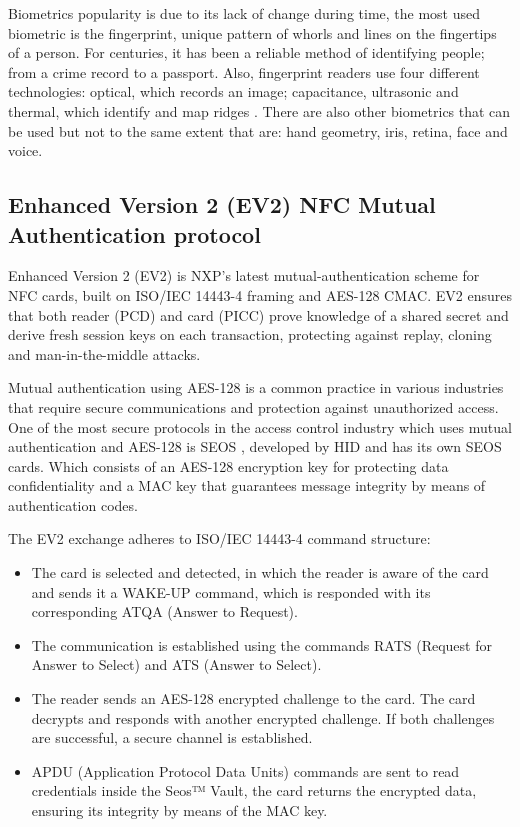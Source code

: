 Biometrics popularity is due to its lack of change during time, the most used biometric is the fingerprint, unique pattern of whorls and lines on the fingertips of a person. For centuries, it has been a reliable method of identifying people; from a crime record to a passport. Also, fingerprint readers use four different technologies: optical, which records an image; capacitance, ultrasonic and thermal, which identify and map ridges \cite{ref30}. There are also other biometrics that can be used but not to the same extent that are: hand geometry, iris, retina, face and voice.

\subsection{Enhanced Version 2 (EV2) NFC Mutual Authentication protocol}

Enhanced Version 2 (EV2) \cite{ref29} is NXP’s latest mutual-authentication scheme for NFC cards, built on ISO/IEC 14443-4 framing and AES-128 CMAC. EV2 ensures that both reader (PCD) and card (PICC) prove knowledge of a shared secret and derive fresh session keys on each transaction, protecting against replay, cloning and man-in-the-middle attacks.

Mutual authentication using AES-128 is a common practice in various industries that require secure communications and protection against unauthorized access. One of the most secure protocols in the access control industry which uses mutual authentication and AES-128 is SEOS \cite{ref31}, developed by HID and has its own SEOS cards. Which consists of an AES-128 encryption key for protecting data confidentiality and a MAC key that guarantees message integrity by means of authentication codes.

The EV2 exchange adheres to ISO/IEC 14443-4 command structure:
\begin{itemize}
	\item The card is selected and detected, in which the reader is aware of the card and sends it a WAKE-UP command, which is responded with its corresponding ATQA (Answer to Request).
	\item The communication is established using the commands RATS (Request for Answer to Select) and ATS (Answer to Select).
	\item The reader sends an AES-128 encrypted challenge to the card. The card decrypts and responds with another encrypted challenge. If both challenges are successful, a secure channel is established.
	\item APDU (Application Protocol Data Units) commands are sent to read credentials inside the Seos™ Vault, the card returns the encrypted data, ensuring its integrity by means of the MAC key.
\end{itemize}

